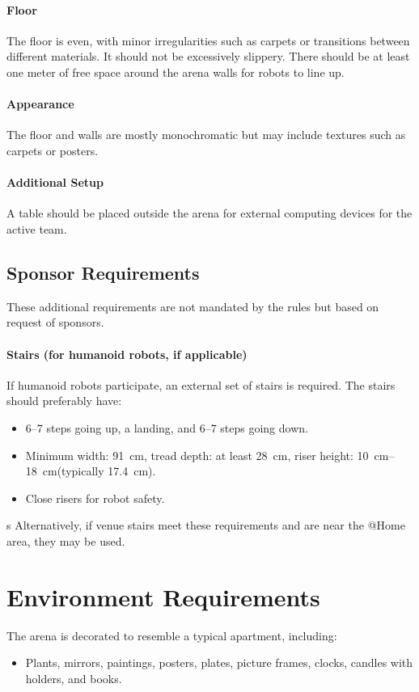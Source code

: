 \paragraph{Floor} The floor is even, with minor irregularities such as carpets or transitions between different materials. It should not be excessively slippery. There should be at least one meter of free space around the arena walls for robots to line up.

\paragraph{Appearance} The floor and walls are mostly monochromatic but may include textures such as carpets or posters.

\paragraph{Additional Setup} A table should be placed outside the arena for external computing devices for the active team.

\subsection{Sponsor Requirements}

These additional requirements are not mandated by the rules but based on request of sponsors.

\paragraph{Stairs (for humanoid robots, if applicable)} If humanoid robots participate, an external set of stairs is required. The stairs should preferably have:
\begin{itemize}
    \item 6--7 steps going up, a landing, and 6--7 steps going down.
    \item Minimum width: \qty{91}{\centi\metre}, tread depth: at least \qty{28}{\centi\metre}, riser height: \qtyrange{10}{18}{\centi\metre}(typically \qty{17.4}{\centi\metre}).
    \item Close risers for robot safety.
\end{itemize}s
Alternatively, if venue stairs meet these requirements and are near the @Home area, they may be used.

\section{Environment Requirements}
The arena is decorated to resemble a typical apartment, including:
\begin{itemize}
    \item Plants, mirrors, paintings, posters, plates, picture frames, clocks, candles with holders, and books.
\end{itemize}

